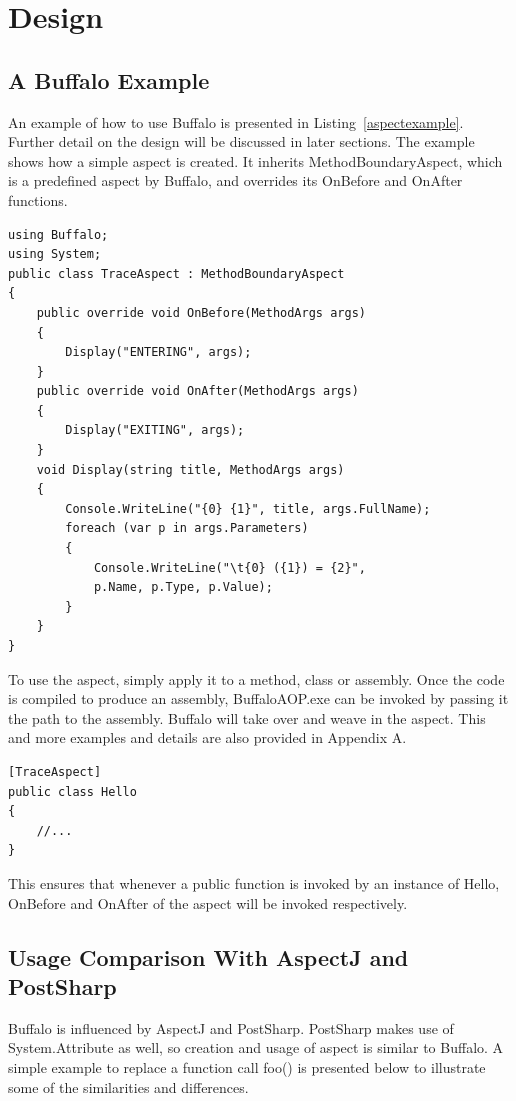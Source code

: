 \chapter{Design}

\section{A Buffalo Example}

An example of how to use Buffalo is presented in Listing~\ref{aspectexample}. Further detail on the design will be discussed in later sections. The example shows how a simple aspect is created. It inherits MethodBoundaryAspect, which is a predefined aspect by Buffalo, and overrides its OnBefore and OnAfter functions.

\begin{lstlisting}[caption={Sample TraceAspect}, label=aspectexample]
using Buffalo;
using System;
public class TraceAspect : MethodBoundaryAspect
{
    public override void OnBefore(MethodArgs args)
    {
        Display("ENTERING", args);
    }
    public override void OnAfter(MethodArgs args)
    {
        Display("EXITING", args);
    }
    void Display(string title, MethodArgs args)
    {
        Console.WriteLine("{0} {1}", title, args.FullName);
        foreach (var p in args.Parameters)
        {
            Console.WriteLine("\t{0} ({1}) = {2}", 
			p.Name, p.Type, p.Value);
        }
    }
}
\end{lstlisting}

To use the aspect, simply apply it to a method, class or assembly. Once the code is compiled to produce an assembly, BuffaloAOP.exe can be invoked by passing it the path to the assembly. Buffalo will take over and weave in the aspect. This and more examples and details are also provided in Appendix A.

\begin{lstlisting}[caption={Apply Aspect on Class Level}, label=helloaspect]
[TraceAspect]
public class Hello
{
	//...
}
\end{lstlisting}

This ensures that whenever a public function is invoked by an instance of Hello, OnBefore and OnAfter of the aspect will be invoked respectively.

\section{Usage Comparison With AspectJ and PostSharp}

Buffalo is influenced by AspectJ and PostSharp. PostSharp makes use of System.Attribute as well, so creation and usage of aspect is similar to Buffalo. A simple example to replace a function call foo() is presented below to illustrate some of the similarities and differences.

